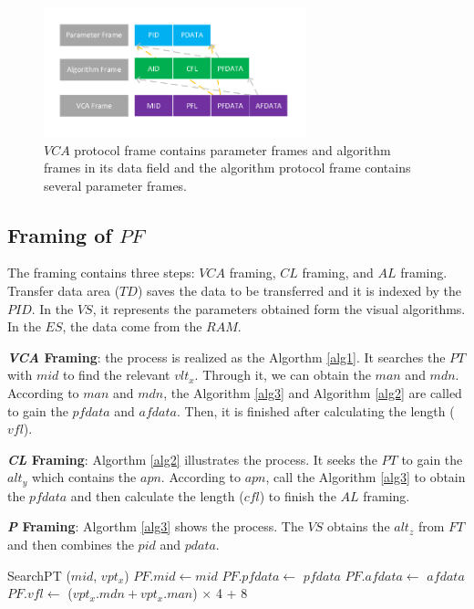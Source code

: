 \documentclass[journal,UTF8]{IEEEtran}
\begin{document}
\begin{figure}
	\centering
	\includegraphics[width=3in]{fig/Protocol.pdf}
	\caption{ $VCA$ protocol frame contains parameter frames and algorithm frames in its data field and the algorithm protocol frame contains several parameter frames.}
	\label{fig:Protocol}
\end{figure}
\subsection{Framing of $PF$}
The framing contains three steps: $VCA$ framing, $CL$ framing, and $AL$ framing. Transfer data area ($TD$) saves the data to be transferred and it is indexed by the $PID$. In the $VS$, it represents the parameters obtained form the visual algorithms. In the $ES$, the data come from the $RAM$.   


\textbf{\emph{VCA} Framing}: the process is realized as the Algorthm \ref{alg1}. It searches the $PT$ with $mid$ to find the relevant $vlt_x$. Through it, we can obtain the $man$ and $mdn$. According to $man$ and $mdn$, the Algorithm \ref{alg3} and Algorithm \ref{alg2} are called to gain the $pfdata$ and $afdata$. Then, it is finished after calculating the length ($vfl$).

\textbf{\emph{CL} Framing}: Algorthm \ref{alg2} illustrates the process. It seeks the $PT$ to gain the $alt_y$ which contains the $apn$. According to $apn$, call the Algorithm \ref{alg3} to obtain the $pfdata$ and then calculate the length ($cfl$) to finish the $AL$ framing.  

\textbf{\emph{P} Framing}: Algorthm \ref{alg3} shows the process. The $VS$ obtains the $alt_z$ from $FT$ and then combines the $pid$ and $pdata$.


\begin{algorithm}
	\label{alg1}
	\caption{$VCAFraming$}%
	SearchPT ($mid$, $vpt_x$)\;
	$PF.mid\leftarrow mid$\; 
    $PF.pfdata\leftarrow$ $pfdata$\; 
    $PF.afdata\leftarrow$ $afdata$\; 
	$PF.vfl\leftarrow$ ($vpt_x.mdn+vpt_x.man$) $\times$ 4 + 8\;
\end{algorithm}
\end{document}
